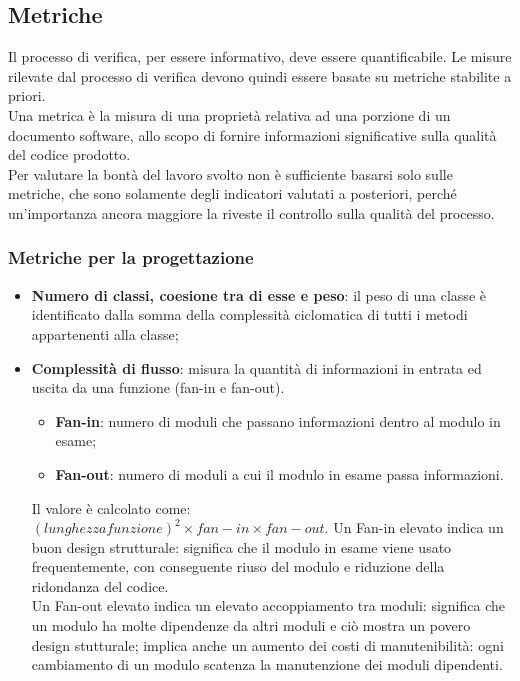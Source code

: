 \subsection{Metriche}{
	\label{sec:metriche}
	Il processo di verifica, per essere informativo, deve essere quantificabile. Le misure rilevate dal processo di verifica devono quindi essere basate su metriche stabilite a priori. \\
	Una metrica è la misura di una proprietà relativa ad una porzione di un documento software, allo scopo di fornire informazioni significative sulla qualità del codice prodotto. \\
	Per valutare la bontà del lavoro svolto non è sufficiente basarsi solo sulle metriche, che sono solamente degli indicatori valutati a posteriori, perché un'importanza ancora maggiore la riveste il controllo sulla qualità del processo.
\subsubsection{Metriche per la progettazione}{
	\begin{itemize}
		\item \textbf{Numero di classi, coesione tra di esse e peso}: il peso di una classe è identificato dalla somma della complessità ciclomatica di tutti i metodi appartenenti alla classe;
	 	\item \textbf{Complessità di flusso}: misura la quantità di informazioni in	entrata ed uscita da una funzione (fan-in e fan-out).\\
	 	\begin{itemize}
	 	 \item \textbf{Fan-in}: numero di moduli che passano informazioni dentro al modulo in esame;
	 	 \item \textbf{Fan-out}: numero di moduli a cui il modulo in esame passa informazioni.
	 	\end{itemize}
	 	Il valore è calcolato come:\\
	 	$(lunghezzafunzione)^2\times fan-in \times fan-out.$
	 	Un Fan-in elevato indica un buon design strutturale: significa che il modulo in esame viene usato frequentemente, con conseguente riuso del modulo e riduzione della ridondanza del codice.\\
	 	Un Fan-out elevato indica un elevato accoppiamento tra moduli: significa che un modulo ha molte dipendenze da altri moduli e ciò mostra un povero design stutturale;
	 	implica anche un aumento dei costi di manutenibilità: ogni cambiamento di un modulo scatenza la manutenzione dei moduli dipendenti.
	\end{itemize}
	}
}
